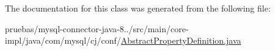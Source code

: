 The documentation for this class was generated from the following file\+:\begin{DoxyCompactItemize}
\item 
pruebas/mysql-\/connector-\/java-\/8../src/main/core-\/impl/java/com/mysql/cj/conf/\mbox{\hyperlink{_abstract_property_definition_8java}{Abstract\+Property\+Definition.\+java}}\end{DoxyCompactItemize}
